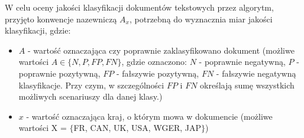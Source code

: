 \documentclass{classrep}
\begin{document}

W celu oceny jakości klasyfikacji dokumentów tekstowych \cite{teksty} przez algorytm, przyjęto konwencje nazewniczą $A_x$, potrzebną do wyznacznia miar jakości klasyfikacji, gdzie:
\begin{itemize}
\item $A$ - wartość oznaczająca czy poprawnie zaklasyfikowano dokument (możliwe wartości  $A \in \{N, P, FP, FN\}$, gdzie oznaczono: \(N\) - poprawnie negatywną, \(P\) - poprawnie pozytywną, \(FP\) - fałszywie pozytywną, \(FN\) - fałszywie negatywną klasyfikacje. 
Przy czym, w szczególności \(FP\) i \(FN\) określają sumę wszystkich możliwych scenariuszy dla danej klasy.)
\item $x$ - wartość oznaczająca kraj, o którym mowa w dokumencie (możliwe wartości X = $\{$FR, CAN, UK, USA, WGER, JAP$\}$)
\end{itemize} \hfill \break

\end{document}
